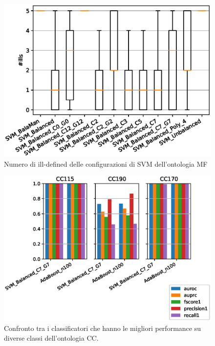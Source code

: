 \documentclass[12pt,a4paper,oneside,hidelinks]{report}
\begin{document}
\begin{figure}[hb]%
    \centering
    \includegraphics[scale = 0.80]{MF-SVM-ills.eps}%
    \caption{Numero di ill-defined delle configurazioni di SVM dell'ontologia MF}%
    \label{figure:ill14}%
\end{figure}

\vspace*{\fill}


\vspace*{\fill}

\begin{figure}[ht]%
    \centering
    \includegraphics[scale = 0.80]{CC-level2.eps}%
    \caption{Confronto tra i classificatori che hanno le migliori performance su diverse classi dell'ontologia CC.}%
    \label{fig:liv2} 
\end{figure}
\end{document}
